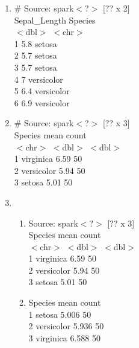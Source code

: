 \documentclass[12pt]{article}
\begin{document}
\begin{enumerate}
\begin{enumerate}
    \end{enumerate}
    \item
    # Source: spark$<$?$>$ [?? x 2]\\
  Sepal\_Length Species\\
         $<$dbl$>$ $<$chr$>$\\
1          5.8 setosa \\
2          5.7 setosa \\
3          5.7 setosa \\
4          7   versicolor \\
5          6.4 versicolor \\
6          6.9 versicolor \\
    \item  
    # Source: spark$<$?$>$ [?? x 3] \\
  Species     mean count \\
  $<$chr$>$     $<$dbl$>$ $<$dbl$>$ \\
1 virginica   6.59    50 \\
2 versicolor  5.94    50 \\
3 setosa      5.01    50 \\
    \item
    \begin{enumerate}
        \item 
     Source: spark$<$?$>$ [?? x 3] \\
  Species     mean count \\
  $<$chr$>$     $<$dbl$>$ $<$dbl$>$ \\
1 virginica   6.59    50 \\
2 versicolor  5.94    50 \\
3 setosa      5.01    50 \\
        \item
             Species  mean count \\
1     setosa 5.006    50 \\
2 versicolor 5.936    50 \\ 
3  virginica 6.588    50 \\
    \end{enumerate}
    
    
\end{enumerate}
\end{document}
